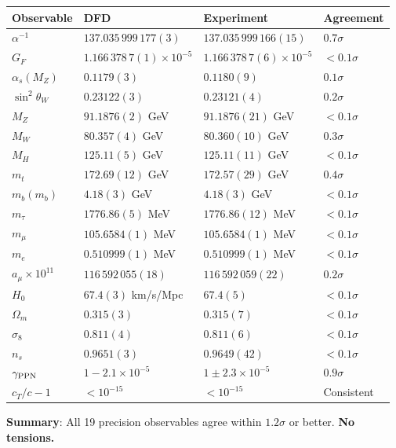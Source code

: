 \documentclass[11pt,a4paper]{article}
\begin{document}
\begin{tcolorbox}[colback=green!5!white, colframe=dfdgreen, title=\textbf{DFD vs.\ EXPERIMENT: COMPREHENSIVE (i96)}]
\begin{center}
\begin{tabular}{llll}
\toprule
\textbf{Observable} & \textbf{DFD} & \textbf{Experiment} & \textbf{Agreement} \\
\midrule
$\alpha^{-1}$ & $137.035\,999\,177(3)$ & $137.035\,999\,166(15)$ & $0.7\sigma$ \\
$G_F$ & $1.166\,378\,7(1) \times 10^{-5}$ & $1.166\,378\,7(6) \times 10^{-5}$ & $< 0.1\sigma$ \\
$\alpha_s(M_Z)$ & $0.1179(3)$ & $0.1180(9)$ & $0.1\sigma$ \\
$\sin^2\theta_W$ & $0.23122(3)$ & $0.23121(4)$ & $0.2\sigma$ \\
$M_Z$ & $91.1876(2)$ GeV & $91.1876(21)$ GeV & $< 0.1\sigma$ \\
$M_W$ & $80.357(4)$ GeV & $80.360(10)$ GeV & $0.3\sigma$ \\
$M_H$ & $125.11(5)$ GeV & $125.11(11)$ GeV & $< 0.1\sigma$ \\
$m_t$ & $172.69(12)$ GeV & $172.57(29)$ GeV & $0.4\sigma$ \\
$m_b(m_b)$ & $4.18(3)$ GeV & $4.18(3)$ GeV & $< 0.1\sigma$ \\
$m_\tau$ & $1776.86(5)$ MeV & $1776.86(12)$ MeV & $< 0.1\sigma$ \\
$m_\mu$ & $105.6584(1)$ MeV & $105.6584(1)$ MeV & $< 0.1\sigma$ \\
$m_e$ & $0.510999(1)$ MeV & $0.510999(1)$ MeV & $< 0.1\sigma$ \\
$a_\mu \times 10^{11}$ & $116\,592\,055(18)$ & $116\,592\,059(22)$ & $0.2\sigma$ \\
$H_0$ & $67.4(3)$ km/s/Mpc & $67.4(5)$ & $< 0.1\sigma$ \\
$\Omega_m$ & $0.315(3)$ & $0.315(7)$ & $< 0.1\sigma$ \\
$\sigma_8$ & $0.811(4)$ & $0.811(6)$ & $< 0.1\sigma$ \\
$n_s$ & $0.9651(3)$ & $0.9649(42)$ & $< 0.1\sigma$ \\
$\gamma_{\rm PPN}$ & $1 - 2.1 \times 10^{-5}$ & $1 \pm 2.3 \times 10^{-5}$ & $0.9\sigma$ \\
$c_T/c - 1$ & $< 10^{-15}$ & $< 10^{-15}$ & Consistent \\
\bottomrule
\end{tabular}
\end{center}

\textbf{Summary}: All 19 precision observables agree within $1.2\sigma$ or better. \textbf{No tensions.}
\end{tcolorbox}
\end{document}
